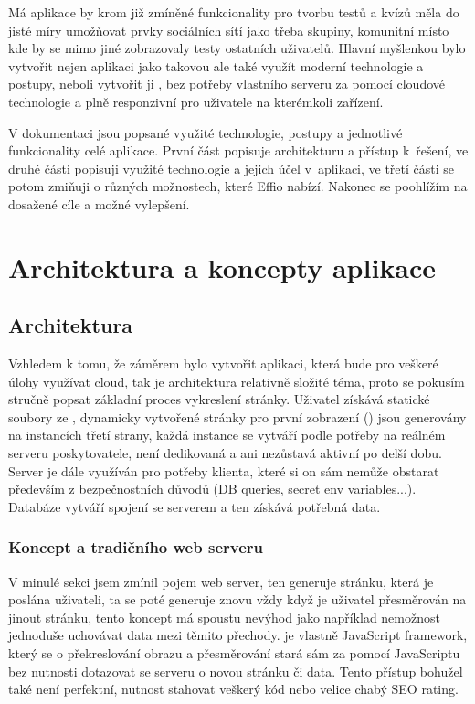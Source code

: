 \documentclass[12pt, a4paper,
openright
]{report}
\begin{document}
Má aplikace by krom již zmíněné funkcionality pro tvorbu testů a kvízů měla do jisté míry umožňovat prvky sociálních sítí jako třeba skupiny, komunitní místo kde by se mimo jiné zobrazovaly testy ostatních uživatelů. Hlavní myšlenkou bylo vytvořit nejen aplikaci jako takovou ale také využít moderní technologie a postupy, neboli vytvořit ji , bez potřeby vlastního serveru za pomocí cloudové technologie  a plně responzivní pro uživatele na kterémkoli zařízení.

V dokumentaci jsou popsané využité technologie, postupy a jednotlivé funkcionality celé aplikace. První část popisuje architekturu a přístup k~řešení, ve druhé části popisuji využité technologie a jejich účel v~aplikaci, ve třetí části se potom zmiňuji o různých možnostech, které Effio nabízí. Nakonec se poohlížím na dosažené cíle a možné vylepšení.



\chapter{Architektura a koncepty aplikace}

\section{Architektura}

Vzhledem k tomu, že záměrem bylo vytvořit aplikaci, která bude pro veškeré  úlohy využívat cloud, tak je architektura relativně složité téma, proto se pokusím stručně popsat základní proces vykreslení stránky. Uživatel získává statické soubory ze , dynamicky vytvořené stránky pro první zobrazení () jsou generovány na instancích  třetí strany, každá instance se vytváří podle potřeby na reálném serveru poskytovatele, není dedikovaná a ani nezůstavá aktivní po delší dobu. Server je dále využíván pro potřeby klienta, které si on sám nemůže obstarat především z bezpečnostních důvodů (DB queries, secret env variables...). Databáze vytváří spojení se serverem a ten získává potřebná data.

\subsection{Koncept  a tradičního web serveru }
V minulé sekci jsem zmínil pojem web server, ten generuje stránku, která je poslána uživateli, ta se poté generuje znovu vždy když je uživatel přesměrován na jinout stránku, tento koncept má spoustu nevýhod jako například nemožnost jednoduše uchovávat data mezi těmito přechody. je vlastně JavaScript framework, který se o překreslování obrazu a přesměrování stará sám za pomocí JavaScriptu bez nutnosti dotazovat se serveru o novou stránku či data. Tento přístup bohužel také není perfektní, nutnost stahovat veškerý kód nebo velice chabý SEO rating.
\end{document}
